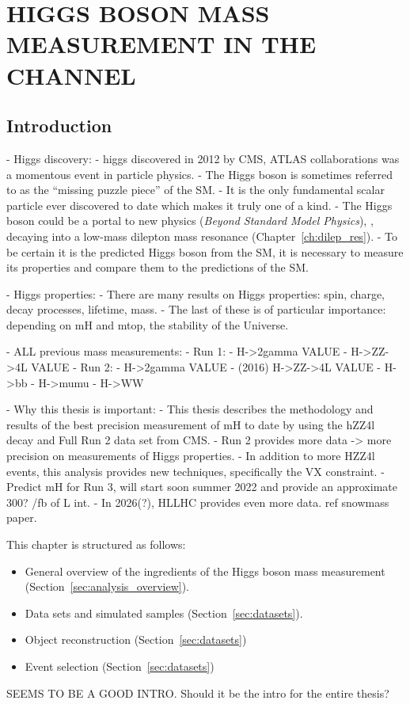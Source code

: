 \chapter{HIGGS BOSON MASS MEASUREMENT IN THE \texorpdfstring{\hzzfourl}{H to ZZ to 4l} CHANNEL}
\section{Introduction}
- Higgs discovery:
    - higgs discovered in 2012 by CMS, ATLAS collaborations was a momentous event in particle physics.
    - The Higgs boson is sometimes referred to as the ``missing puzzle piece'' of the SM.
    - It is the only fundamental scalar particle ever discovered to date which makes it truly one of a kind.
    - The Higgs boson could be a portal to new physics (\emph{Beyond Standard Model Physics}), \eg, decaying into a low-mass dilepton mass resonance (Chapter~\ref{ch:dilep_res}).
    - To be certain it is the predicted Higgs boson from the SM, it is necessary to measure its properties and compare them to the predictions of the SM.

- Higgs properties:
    - There are many results on Higgs properties: spin, charge, decay processes, lifetime, mass.
    - The last of these is of particular importance: depending on mH and mtop, the stability of the Universe.

- ALL previous mass measurements:
    - Run 1:
        - H->2gamma VALUE
        - H->ZZ->4L VALUE
    - Run 2:
        - H->2gamma VALUE
        - (2016) H->ZZ->4L VALUE
        - H->bb
        - H->mumu
        - H->WW 

- Why this thesis is important:
    - This thesis describes the methodology and results of the best precision measurement of mH to date by using the hZZ4l decay and Full Run 2 data set from CMS.
    - Run 2 provides more data -> more precision on measurements of Higgs properties.
    - In addition to more HZZ4l events, this analysis provides new techniques, specifically the VX constraint.
    - Predict mH for Run 3, will start soon summer 2022 and provide an approximate 300? /fb of L int.
    - In 2026(?), HLLHC provides even more data. ref snowmass paper.

This chapter is structured as follows:
\begin{itemize}
    \item General overview of the ingredients of the Higgs boson mass measurement (Section~\ref{sec:analysis_overview}).
    \item Data sets and simulated samples (Section~\ref{sec:datasets}).
    \item Object reconstruction (Section~\ref{sec:datasets})
    \item Event selection (Section~\ref{sec:datasets})
\end{itemize}

SEEMS TO BE A GOOD INTRO. Should it be the intro for the entire thesis?
